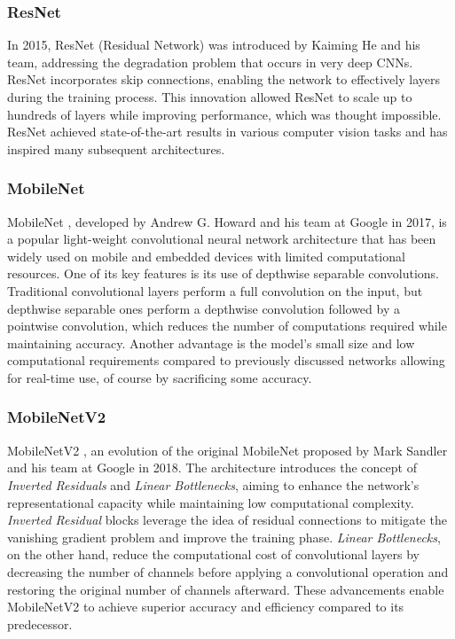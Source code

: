 \subsubsection{ResNet}

In 2015, ResNet (Residual Network) \cite{He2015} was introduced by Kaiming He
and his team, addressing the degradation problem that occurs in very deep CNNs.
ResNet incorporates skip connections, enabling the network to effectively
 layers during the training process. This innovation allowed ResNet to
scale up to hundreds of layers while improving performance, which was thought
impossible.  ResNet achieved state-of-the-art results in various computer vision
tasks and has inspired many subsequent architectures.


\subsubsection{MobileNet}

MobileNet \cite{Howard2017}, developed by Andrew G. Howard and his team at
Google in 2017, is a popular light-weight convolutional neural network
architecture that has been widely used on mobile and embedded devices with
limited computational resources. One of its key features is its use of depthwise
separable convolutions. Traditional convolutional layers perform a full
convolution on the input, but depthwise separable ones perform a depthwise
convolution followed by a pointwise convolution, which reduces the number of
computations required while maintaining accuracy. Another advantage is the
model's small size and low computational requirements compared to previously
discussed networks allowing for real-time use, of course by sacrificing some
accuracy.


\subsubsection{MobileNetV2}

MobileNetV2 \cite{Sandler2018}, an evolution of the original MobileNet
proposed by Mark Sandler and his team at Google in 2018. The architecture
introduces the concept of \textit{Inverted Residuals} and \textit{Linear
Bottlenecks}, aiming to enhance the network's representational capacity while
maintaining low computational complexity. \textit{Inverted Residual} blocks
leverage the idea of residual connections to mitigate the vanishing gradient
problem and improve the training phase. \textit{Linear Bottlenecks}, on the
other hand, reduce the computational cost of convolutional layers by decreasing
the number of channels before applying a convolutional operation and restoring
the original number of channels afterward. These advancements enable MobileNetV2
to achieve superior accuracy and efficiency compared to its predecessor.


